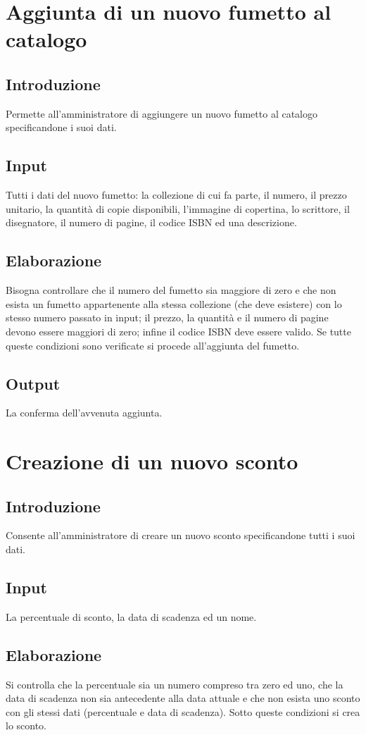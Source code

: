 \documentclass{scrreprt}
\begin{document}
\section{Aggiunta di un nuovo fumetto al catalogo}

\subsection*{Introduzione}
Permette all'amministratore di aggiungere un nuovo fumetto al catalogo specificandone i suoi dati.
\subsection*{Input}
Tutti i dati del nuovo fumetto: la collezione di cui fa parte, il numero, il prezzo unitario, la quantità
di copie disponibili, l'immagine di copertina, lo scrittore, il disegnatore, il numero di pagine, il codice
ISBN ed una descrizione.
\subsection*{Elaborazione}
Bisogna controllare che il numero del fumetto sia maggiore di zero e che non esista un fumetto appartenente alla
stessa collezione (che deve esistere) con lo stesso numero passato in input; il prezzo, la quantità e il numero
di pagine devono essere maggiori di zero; infine il codice ISBN deve essere valido.
Se tutte queste condizioni sono verificate si procede all'aggiunta del fumetto.
\subsection*{Output}
La conferma dell'avvenuta aggiunta.

\section{Creazione di un nuovo sconto}

\subsection*{Introduzione}
Consente all'amministratore di creare un nuovo sconto specificandone tutti i suoi dati.
\subsection*{Input}
La percentuale di sconto, la data di scadenza ed un nome.
\subsection*{Elaborazione}
Si controlla che la percentuale sia un numero compreso tra zero ed uno, che la data di scadenza non sia
antecedente alla data attuale e che non esista uno sconto con gli stessi dati (percentuale e data di scadenza).
Sotto queste condizioni si crea lo sconto.
\end{document}
